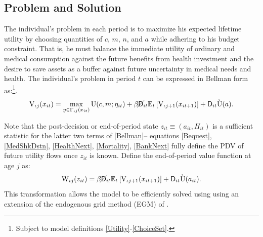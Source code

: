 \documentclass[12pt,pdftex,letterpaper]{article}
\newcommand{\E}{\mathbb{E}}
\newcommand{\PostHealth}{H}
\newcommand{\Utility}{\text{U}}
\newcommand{\Value}{\text{V}}
\newcommand{\PostValue}{\text{W}}
\newcommand{\Con}{c}
\newcommand{\Care}{m}
\newcommand{\Invst}{n}
\newcommand{\Assets}{a}
\newcommand{\DiscFac}{\beta}
\newcommand{\MedShk}{\eta}
\newcommand{\DiePrb}{\mathsf{D}}
\newcommand{\LivPrb}{\cancel{\DiePrb}}
\newcommand{\BudgetCorr}{\Gamma}
\newcommand{\State}{x}
\newcommand{\Control}{y}
\newcommand{\PostState}{z}
\begin{document}
\subsection{Problem and Solution}
\label{sec:Problem}

The individual's problem in each period is to maximize his expected lifetime utility by choosing quantities of $\Con$, $\Care$, $\Invst$, and $\Assets$ while adhering to his budget constraint.  That is, he must balance the immediate utility of ordinary and medical consumption against the future benefits from health investment and the desire to save assets as a buffer against future uncertainty in medical needs and health.  The individual's problem in period $t$ can be expressed in Bellman form as:\footnote{Subject to model definitions \eqref{Utility}-\eqref{ChoiceSet}.}.
\begin{equation}\label{Bellman}
\Value_{\iota j}(\State_{it}) = \max_{\Control \in \BudgetCorr_{\iota j}(\State_{it})} \Utility(\Con,\Care;\MedShk_{it}) + 
\DiscFac \LivPrb_{it} \E_t \left[ \Value_{\iota j+1}(\State_{it+1}) \right] + \DiePrb_{it} \grave{\Utility}(\Assets).
\end{equation}

Note that the post-decision or end-of-period state $\PostState_{it} \equiv (\Assets_{it},\PostHealth_{it})$ is a sufficient statistic for the latter two terms of \eqref{Bellman}-- equations \eqref{Bequest}, \eqref{MedShkDstn}, \eqref{HealthNext}, \eqref{Mortality}, \eqref{BankNext} fully define the PDV of future utility flows once $\PostState_{it}$ is known.  Define the end-of-period value function at age $j$ as:
\begin{equation}
\PostValue_{\iota j}(\PostState_{it}) = \DiscFac \LivPrb_{it} \E_t \left[ \Value_{\iota j+1}(\State_{it+1}) \right] + \DiePrb_{it} \grave{\Utility}(\Assets_{it}).
\end{equation}
This transformation allows the model to be efficiently solved using using an extension of the endogenous grid method (EGM) of \cite{Carroll06}.
\end{document}
